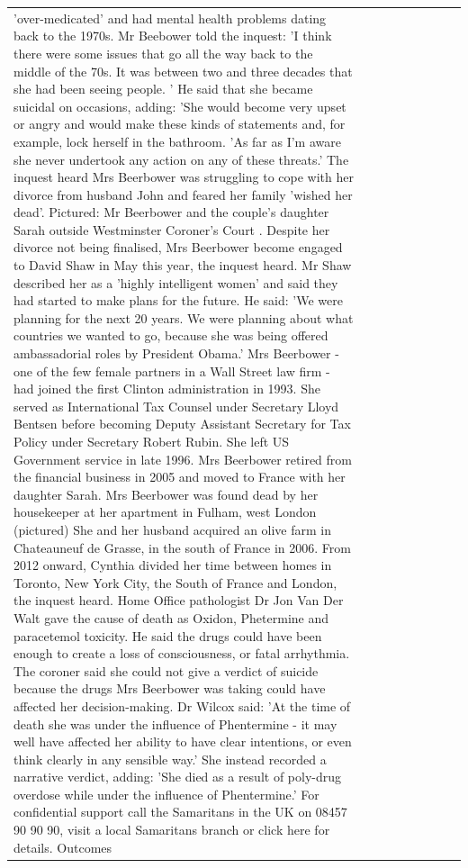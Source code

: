 \begin{table}[H]
\begin{tabular}{lllrlllll}
'over-medicated' and had mental health problems dating back to the 1970s. Mr Beebower told the inquest: 'I think there were some issues that go all the way back to the middle of the 70s. It was between two and three decades that she had been seeing people. ' He said that she became suicidal on occasions, adding: 'She would become very upset or angry and would make these kinds of statements and, for example, lock herself in the bathroom. 'As far as I'm aware she never undertook any action on any of these threats.' The inquest heard Mrs Beerbower was struggling to cope with her divorce from husband John and feared her family 'wished her dead'. Pictured: Mr Beerbower and the couple's daughter Sarah outside Westminster Coroner's Court . Despite her divorce not being finalised, Mrs Beerbower become engaged to David Shaw in May this year, the inquest heard. Mr Shaw described her as a 'highly intelligent women' and said they had started to make plans for the future. He said: 'We were planning for the next 20 years. We were planning about what countries we wanted to go, because she was being offered ambassadorial roles by President Obama.' Mrs Beerbower - one of the few female partners in a Wall Street law firm - had joined the first Clinton administration in 1993. She served as International Tax Counsel under Secretary Lloyd Bentsen before becoming Deputy Assistant Secretary for Tax Policy under Secretary Robert Rubin. She left US Government service in late 1996. Mrs Beerbower retired from the financial business in 2005 and moved to France with her daughter Sarah. Mrs Beerbower was found dead by her housekeeper at her apartment in Fulham, west London (pictured) She and her husband acquired an olive farm in Chateauneuf de Grasse, in the south of France in 2006. From 2012 onward, Cynthia divided her time between homes in Toronto, New York City, the South of France and London, the inquest heard. Home Office pathologist Dr Jon Van Der Walt gave the cause of death as Oxidon, Phetermine and paracetemol toxicity. He said the drugs could have been enough to create a loss of consciousness, or fatal arrhythmia. The coroner said she could not give a verdict of suicide because the drugs Mrs Beerbower was taking could have affected her decision-making. Dr Wilcox said: 'At the time of death she was under the influence of Phentermine - it may well have affected her ability to have clear intentions, or even think clearly in any sensible way.' She instead recorded a narrative verdict, adding: 'She died as a result of poly-drug overdose while under the influence of Phentermine.' For confidential support call the Samaritans in the UK on 08457 90 90 90, visit a local Samaritans branch or click here for details. Outcomes \\

\end{tabular}
\end{table}
